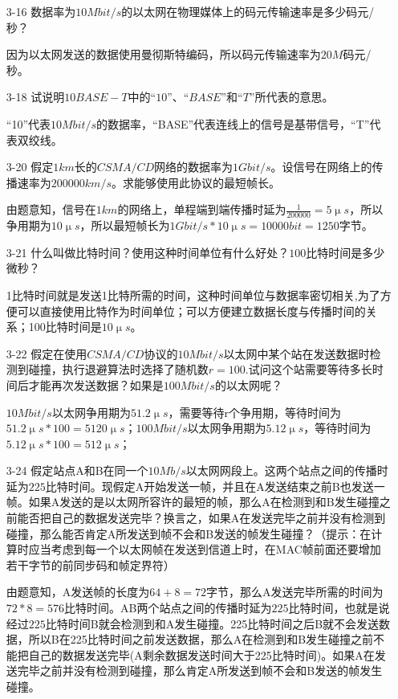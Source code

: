 \documentclass[a4paper,UTF8]{article}
\begin{document}
\begin{enumerate}
\item[3-16] 数据率为$10Mbit/s$的以太网在物理媒体上的码元传输速率是多少码元/秒？
\begin{solution}
    因为以太网发送的数据使用曼彻斯特编码，所以码元传输速率为$20M$码元/秒。
\end{solution}

\item[3-18] 试说明$10BASE-T$中的“$10$”、“$BASE$”和“$T$”所代表的意思。
\begin{solution}
    “10”代表$10Mbit/s$的数据率，“BASE”代表连线上的信号是基带信号，“T”代表双绞线。
\end{solution}

\item[3-20] 假定$1km$长的$CSMA/CD$网络的数据率为$1Gbit/s$。设信号在网络上的传播速率为$200000km/s$。求能够使用此协议的最短帧长。
\begin{solution}
    由题意知，信号在$1km$的网络上，单程端到端传播时延为$\frac{1}{200000}=5\upmu s$，所以争用期为$10\upmu s$，所以最短帧长为$1Gbit/s * 10\upmu s = 10000bit = 1250$字节。
\end{solution}

\item[3-21] 什么叫做比特时间？使用这种时间单位有什么好处？$100$比特时间是多少微秒？
\begin{solution}
    1比特时间就是发送1比特所需的时间，这种时间单位与数据率密切相关,为了方便可以直接使用比特作为时间单位；可以方便建立数据长度与传播时间的关系；100比特时间是$10\upmu s$。
\end{solution}

\item[3-22] 假定在使用$CSMA/CD$协议的$10Mbit/s$以太网中某个站在发送数据时检测到碰撞，执行退避算法时选择了随机数$r = 100$.试问这个站需要等待多长时间后才能再次发送数据？如果是$100Mbit/s$的以太网呢？
\begin{solution}
    $10Mbit/s$以太网争用期为$51.2\upmu s$，需要等待r个争用期，等待时间为$51.2\upmu s * 100 = 5120\upmu s$；$100Mbit/s$以太网争用期为$5.12\upmu s$，等待时间为$5.12\upmu s * 100 = 512\upmu s$；
\end{solution}

\item[3-24] 假定站点A和B在同一个$10Mb/s$以太网网段上。这两个站点之间的传播时延为$225$比特时间。现假定A开始发送一帧，并且在A发送结束之前B也发送一帧。如果A发送的是以太网所容许的最短的帧，那么A在检测到和B发生碰撞之前能否把自己的数据发送完毕？换言之，如果A在发送完毕之前并没有检测到碰撞，那么能否肯定A所发送到帧不会和B发送的帧发生碰撞？（提示：在计算时应当考虑到每一个以太网帧在发送到信道上时，在MAC帧前面还要增加若干字节的前同步码和帧定界符） 
\begin{solution}
    由题意知，A发送帧的长度为$64 + 8 = 72$字节，那么A发送完毕所需的时间为$72 * 8 = 576$比特时间。AB两个站点之间的传播时延为$225$比特时间，也就是说经过$225$比特时间B就会检测到和A发生碰撞。225比特时间之后B就不会发送数据，所以B在225比特时间之前发送数据，那么A在检测到和B发生碰撞之前不能把自己的数据发送完毕(A剩余数据发送时间大于225比特时间)。如果A在发送完毕之前并没有检测到碰撞，那么肯定A所发送到帧不会和B发送的帧发生碰撞。
\end{solution}


\end{enumerate}
\end{document}
